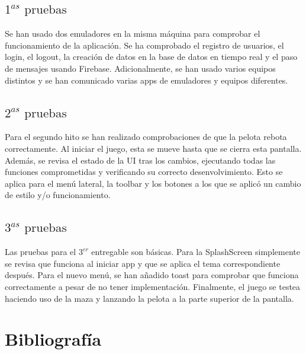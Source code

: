 \documentclass[a4paper,openright,12pt]{article}
\begin{document}
\subsection{$1^{as} \text{ pruebas}$}
Se han usado dos emuladores en la misma máquina para comprobar el funcionamiento de la aplicación. Se ha comprobado el registro de usuarios, el login, el logout, la creación de datos en la base de datos en tiempo real y el paso de mensajes usando Firebase. Adicionalmente, se han usado varios equipos distintos y se han comunicado varias apps de emuladores y equipos diferentes.

\subsection{$2^{as} \text{ pruebas}$}
Para el segundo hito se han realizado comprobaciones de que la pelota rebota correctamente. Al iniciar el juego, esta se mueve hasta que se cierra esta pantalla. Además, se revisa el estado de la UI tras los cambios, ejecutando todas las funciones comprometidas y verificando su correcto desenvolvimiento. Esto se aplica para el menú lateral, la toolbar y los botones a los que se aplicó un cambio de estilo y/o funcionamiento.


\subsection{$3^{as} \text{ pruebas}$}
Las pruebas para el {$3^{er}$} entregable son básicas. Para la SplashScreen simplemente se revisa que funciona al iniciar app y que se aplica el tema correspondiente después. Para el nuevo menú, se han añadido toast para comprobar que funciona correctamente a pesar de no tener implementación. Finalmente, el juego se testea haciendo uso de la maza y lanzando la pelota a la parte superior de la pantalla.

\section{Bibliografía}


\end{document}

